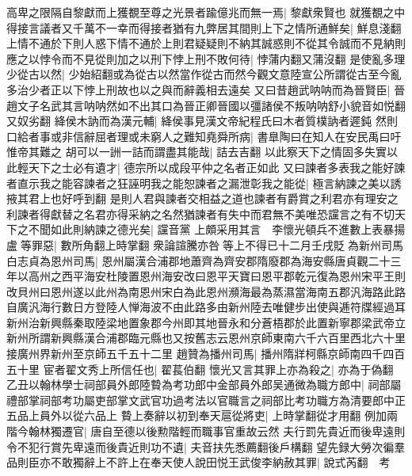 高卑之限隔自黎獻而上獲覩至尊之光景者踰億兆而無一焉|{
	黎獻衆賢也}
就獲覩之中得接言議者又千萬不一幸而得接者猶有九弊居其間則上下之情所通鮮矣|{
	鮮息淺翻}
上情不通於下則人惑下情不通於上則君疑疑則不納其誠惑則不從其令誠而不見納則應之以悖令而不見從則加之以刑下悖上刑不敗何待|{
	悖蒲内翻又蒲沒翻}
是使亂多理少從古以然|{
	少始紹翻或為從古以然當作從古而然今觀文意陸宣公所謂從古至今亂多治少者正以下悖上刑故也以之與而辭義相去遠矣}
又曰昔趙武呐呐而為晉賢臣|{
	晉趙文子名武其言呐呐然如不出其口為晉正卿晉國以彊諸侯不叛呐呐舒小貌音如悦翻又奴劣翻}
絳侯木訥而為漢元輔|{
	絳侯事見漢文帝紀程氏曰木者質樸訥者遲鈍}
然則口給者事或非信辭屈者理或未窮人之難知堯舜所病|{
	書臯陶曰在知人在安民禹曰吁惟帝其難之}
胡可以一詶一詰而謂盡其能哉|{
	詰去吉翻}
以此察天下之情固多失實以此輕天下之士必有遺才|{
	德宗所以成段平仲之名者正如此}
又曰諫者多表我之能好諫者直示我之能容諫者之狂誣明我之能恕諫者之漏泄彰我之能從|{
	極言納諫之美以誘掖其君上也好呼到翻}
是則人君與諫者交相益之道也諫者有爵賞之利君亦有理安之利諫者得獻替之名君亦得采納之名然猶諫者有失中而君無不美唯恐讜言之有不切天下之不聞如此則納諫之德光矣|{
	讜音黨}
上頗采用其言　李懷光頓兵不進數上表暴揚盧等罪惡|{
	數所角翻上時掌翻}
衆論諠騰亦咎等上不得已十二月壬戌貶為新州司馬白志貞為恩州司馬|{
	恩州屬漢合浦郡地蕭齊為齊安郡隋廢郡為海安縣唐貞觀二十三年以高州之西平海安杜陵置恩州海安改曰恩平天寶曰恩平郡乾元復為恩州宋平王則改貝州曰恩州遂以此州為南恩州宋白為此恩州瀕海最為蒸濕當海南五郡汎海路此路自廣汎海行數日方登陸人惮海波不由此路多由新州陸去唯健步出使與逓符牒經過耳新州治新興縣秦取陸梁地置象郡今州即其地晉永和分蒼梧郡於此置新寧郡梁武帝立新州所謂新興縣漢合浦郡臨元縣也又按舊志云恩州京師東南六千六百里西北六十里接廣州界新州至京師五千五十二里}
趙贊為播州司馬|{
	播州隋牂柯縣京師南四千四百五十里}
宦者翟文秀上所信任也|{
	翟萇伯翻}
懷光又言其罪上亦為殺之|{
	亦為于偽翻}
乙丑以翰林學士祠部員外郎陸䞇為考功郎中金部員外郎吴通微為職方郎中|{
	祠部屬禮部掌祠部考功屬吏部掌文武官功過考法以官職言之祠部比考功職方為清要郎中正五品上員外以從六品上}
䞇上奏辭以初到奉天扈從將吏|{
	上時掌翻從才用翻}
例加兩階今翰林獨遷官|{
	唐自至德以後勲階輕而職事官重故云然}
夫行罰先貴近而後卑遠則令不犯行賞先卑遠而後貴近則功不遺|{
	夫音扶先悉薦翻後戶構翻}
望先録大勞次徧羣品則臣亦不敢獨辭上不許上在奉天使人說田悦王武俊李納赦其罪|{
	說式芮翻　考}


